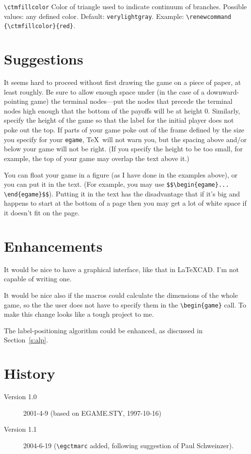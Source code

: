 \documentclass[12pt]{article}
\begin{document}
\sloppy
\noindent\verb+\ctmfillcolor+\newline
\noindent Color of triangle used to indicate continuum of branches.  Possible 
values: any defined color.  Default: \verb+verylightgray+.  Example:
\verb+\renewcommand+ \verb+{\ctmfillcolor}{red}+.

\fussy
\section{Suggestions}
It seems hard to proceed without first drawing the game on a piece of paper,
at least roughly.  Be sure to allow enough space under (in the case of a
downward-pointing game) the terminal nodes---put the nodes that precede the
terminal nodes high enough that the bottom of the payoffs will be at height 0.
 Similarly, specify the height of the game so that the label for the initial
player does not poke out the top.  If parts of your game poke out of the frame
defined by the size you specify for your \verb+egame+, \TeX\ will not warn
you, but the spacing above and/or below your game will not be right.  (If you
specify the height to be too small, for example, the top of your game may
overlap the text above it.)

You can float your game in a figure (as I have done in the examples above), or
you can put it in the text.  (For example, you may use
\verb+$$\begin{egame}...+ \verb+\end{egame}$$+).  Putting it in the text has
the disadvantage that if it's big and happens to start at the bottom of a page
then you may get a lot of white space if it doesn't fit on the page.
\section{Enhancements}
It would be nice to have a graphical interface, like that in \LaTeX CAD\@. 
I'm not capable of writing one.

It would be nice also if the macros could calculate the dimensions of the
whole game, so the the user does not have to specify them in the
\verb+\begin{game}+ call.  To make this change looks like a tough project to
me.

The label-positioning algorithm could be enhanced, as discussed in
Section~\ref{s:alp}.

\section{History}
\begin{description}
\item[Version 1.0] 2001-4-9 (based on EGAME.STY, 1997-10-16)
\item[Version 1.1] 2004-6-19 (\verb+\egctmarc+ added, following suggestion of
Paul Schweinzer).
\end{description}
\end{document}
